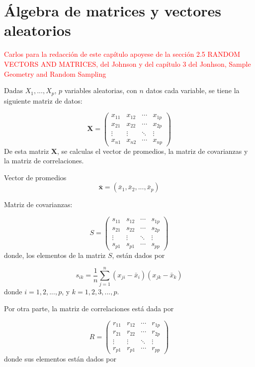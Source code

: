 \chapter{Álgebra de matrices y vectores aleatorios}

\textcolor{red}{Carlos para la redacción de este capítulo apoyese de la sección 2.5 RANDOM VECTORS AND MATRICES, del Johnson y del capítulo 3 del Jonhson, Sample Geometry and Random Sampling }

Dadas $X_{1},...,X_{p}$, $p$ variables aleatorias, con $n$ datos cada variable, se tiene la siguiente matriz de datos:


$$
\mathbf{X}=\left( 
\begin{array}{cccc}
x_{11} & x_{12} & \cdots  & x_{1p} \\ 
x_{21} & x_{22} & \cdots  & x_{2p} \\ 
\vdots  & \vdots  & \ddots  & \vdots  \\ 
x_{n1} & x_{n2} & \cdots  & x_{np}
\end{array}
\right)
$$
De esta matriz $\mathbf{X}$, se calculas el vector de promedios, la matriz de covarianzas y la matriz de correlaciones.

Vector de promedios
$$
\bar{\mathbf{x}}=(\bar{x}_{1},\bar{x}_{2},...,\bar{x}_{p})
$$


Matriz de covarianzas:

$$
S=\left( 
\begin{array}{cccc}
s_{11} & s_{12} & \cdots  & s_{1p} \\ 
s_{21} & s_{22} & \cdots  & s_{2p} \\ 
\vdots  & \vdots  & \ddots  & \vdots  \\ 
s_{p1} & s_{p1} & \cdots  & s_{pp}
\end{array}
\right)
$$
donde, los elementos de la matriz $S$, están dados por 

$$
s_{ik}=\frac{1}{n}\sum_{j=1}^n(x_{ji}-\bar{x}_{i})(x_{jk}-\bar{x}_{k})
$$
donde $i=1,2,...,p$,  y $k=1,2,3,...,p$.

Por otra parte, la matriz de correlaciones está dada por 

$$
R=\left( 
\begin{array}{cccc}
r_{11} & r_{12} & \cdots  & r_{1p} \\ 
r_{21} & r_{22} & \cdots  & r_{2p} \\ 
\vdots  & \vdots  & \ddots  & \vdots  \\ 
r_{p1} & r_{p1} & \cdots  & r_{pp}
\end{array}
\right)
$$
donde sus elementos están dados por 

